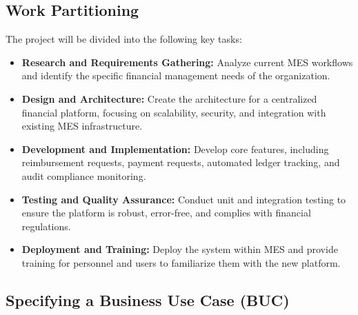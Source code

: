 \documentclass[12pt]{article}
\begin{document}
\subsection{Work Partitioning}
The project will be divided into the following key tasks:
\begin{itemize}
    \item \textbf{Research and Requirements Gathering:} Analyze current MES workflows and identify the specific financial management needs of the organization.
    \item \textbf{Design and Architecture:} Create the architecture for a centralized financial platform, focusing on scalability, security, and integration with existing MES infrastructure.
    \item \textbf{Development and Implementation:} Develop core features, including reimbursement requests, payment requests, automated ledger tracking, and audit compliance monitoring.
    \item \textbf{Testing and Quality Assurance:} Conduct unit and integration testing to ensure the platform is robust, error-free, and complies with financial regulations.
    \item \textbf{Deployment and Training:} Deploy the system within MES and provide training for personnel and users to familiarize them with the new platform.
\end{itemize}

\subsection{Specifying a Business Use Case (BUC)}
\end{document}
